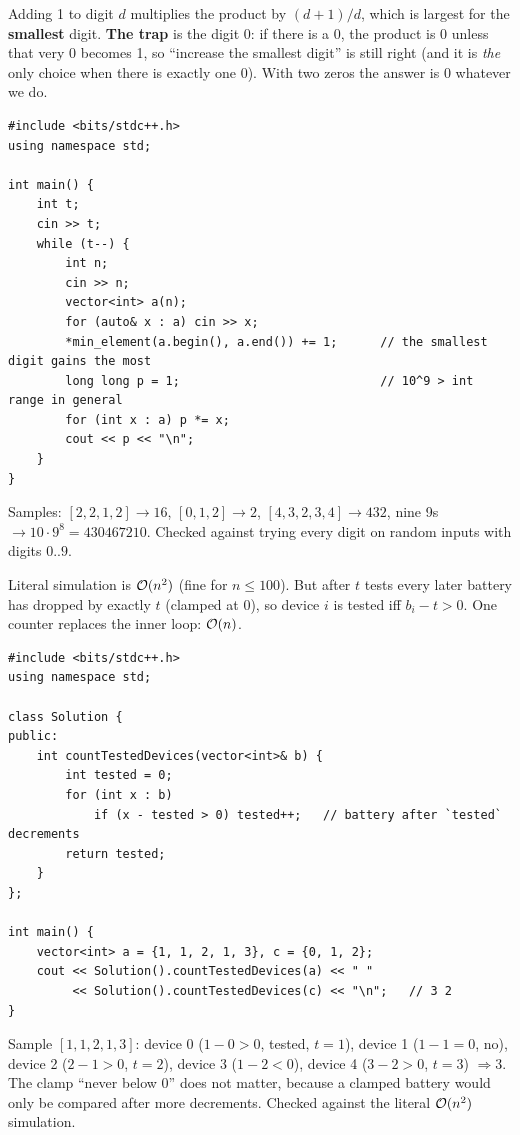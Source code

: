 \begin{solutionbox}
Adding 1 to digit $d$ multiplies the product by $(d+1)/d$, which is largest for the \textbf{smallest} digit. \textbf{The trap} is the digit 0: if there is a 0, the product is 0 unless that very 0 becomes 1, so ``increase the smallest digit'' is still right (and it is \emph{the} only choice when there is exactly one 0). With two zeros the answer is 0 whatever we do.
\begin{lstlisting}[style=cpp]
#include <bits/stdc++.h>
using namespace std;

int main() {
    int t;
    cin >> t;
    while (t--) {
        int n;
        cin >> n;
        vector<int> a(n);
        for (auto& x : a) cin >> x;
        *min_element(a.begin(), a.end()) += 1;      // the smallest digit gains the most
        long long p = 1;                            // 10^9 > int range in general
        for (int x : a) p *= x;
        cout << p << "\n";
    }
}
\end{lstlisting}
Samples: $[2,2,1,2] \to 16$, $[0,1,2] \to 2$, $[4,3,2,3,4] \to 432$, nine 9s $\to 10 \cdot 9^8 = 430467210$. Checked against trying every digit on random inputs with digits $0..9$.
\end{solutionbox}

\begin{solutionbox}
Literal simulation is $\mathcal{O}(n^2)$ (fine for $n \le 100$). But after $t$ tests every later battery has dropped by exactly $t$ (clamped at 0), so device $i$ is tested iff $b_i - t > 0$. One counter replaces the inner loop: $\mathcal{O}(n)$.
\begin{lstlisting}[style=cpp]
#include <bits/stdc++.h>
using namespace std;

class Solution {
public:
    int countTestedDevices(vector<int>& b) {
        int tested = 0;
        for (int x : b)
            if (x - tested > 0) tested++;   // battery after `tested` decrements
        return tested;
    }
};

int main() {
    vector<int> a = {1, 1, 2, 1, 3}, c = {0, 1, 2};
    cout << Solution().countTestedDevices(a) << " "
         << Solution().countTestedDevices(c) << "\n";   // 3 2
}
\end{lstlisting}
Sample $[1,1,2,1,3]$: device 0 ($1 - 0 > 0$, tested, $t = 1$), device 1 ($1 - 1 = 0$, no), device 2 ($2 - 1 > 0$, $t = 2$), device 3 ($1 - 2 < 0$), device 4 ($3 - 2 > 0$, $t = 3$) $\Rightarrow 3$. The clamp ``never below 0'' does not matter, because a clamped battery would only be compared after more decrements. Checked against the literal $\mathcal{O}(n^2)$ simulation.
\end{solutionbox}

